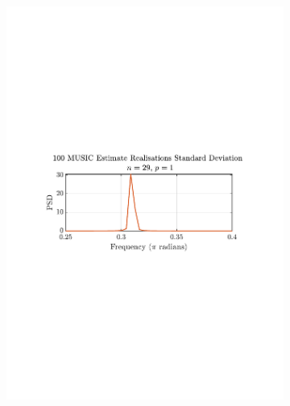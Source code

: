 \documentclass[12pt]{article}
\begin{document}
\begin{figure}[H]
\begin{subfigure}{0.49\textwidth}
			\includegraphics[trim={2.2cm 11cm 3.15cm  11.2cm}, clip, width=\textwidth]{../MATLAB/figures/q1_3e_fig02.pdf} 
		\end{subfigure}
		\begin{subfigure}{0.49\textwidth}
			\centering

\end{subfigure}
\end{figure}
\end{document}
